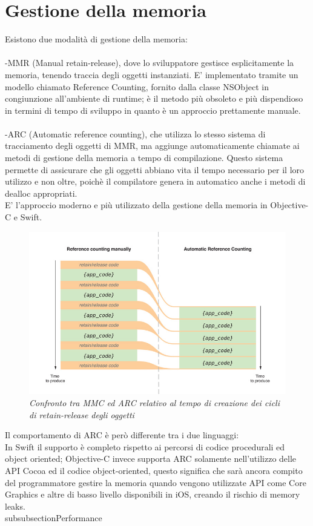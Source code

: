 \section{Gestione della memoria}
Esistono due modalità di gestione della memoria:\\
\\-MMR (Manual retain-release), dove lo sviluppatore gestisce esplicitamente la memoria, tenendo traccia degli oggetti instanziati. E' implementato tramite un modello chiamato Reference Counting, fornito dalla classe NSObject in congiunzione all'ambiente di runtime; è il metodo più obsoleto e più dispendioso in termini di tempo di sviluppo in quanto è un approccio prettamente manuale.\\
\\-ARC (Automatic reference counting), che utilizza lo stesso sistema di tracciamento degli oggetti di MMR, ma aggiunge automaticamente chiamate ai metodi di gestione della memoria a tempo di compilazione. Questo sistema permette di assicurare che gli oggetti abbiano vita il tempo necessario per il loro utilizzo e non oltre, poichè il compilatore genera in automatico anche i metodi di dealloc appropriati.\\E' l'approccio moderno e più utilizzato della gestione della memoria in Objective-C e Swift.
\begin{figure}[H]
      \centering
      \includegraphics[scale=0.40]{immagini/ARC.jpg}
            \vspace{0.8cm}
            \caption{\textit{Confronto tra MMC ed ARC relativo al tempo di creazione dei cicli di retain-release degli oggetti}}
    \end{figure}
Il comportamento di ARC è però differente tra i due linguaggi:\\
In Swift il supporto è completo rispetto ai percorsi di codice procedurali ed object oriented; Objective-C invece supporta ARC solamente nell'utilizzo delle API Cocoa ed il codice object-oriented, questo significa che sarà ancora compito del programmatore gestire la memoria quando vengono utilizzate API come Core Graphics e altre di basso livello disponibili in iOS, creando il rischio di memory leaks.
\\subsubsection{Performance}




